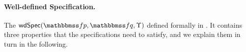 
\paragraph{\textbf{Well-defined Specification.}}
The $\wdSpec{\relspecpre}{\relspecpost}{\hprim}$
defined  formally in
\Def{\ref{def:well-defined specification}}.
It contains three properties that
the specifications need to satisfy,
and we explain them in turn in the following.

